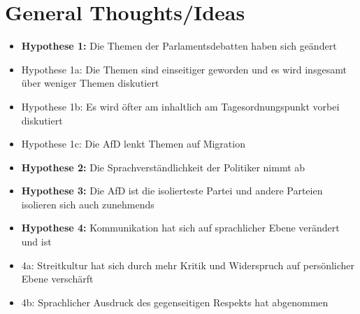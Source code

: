 \section{General Thoughts/Ideas}

\begin{itemize} 
\item [] {\bfseries Hypothese 1:} 
Die Themen der Parlamentsdebatten haben sich geändert
\item  Hypothese 1a: Die Themen sind einseitiger geworden und es wird insgesamt über weniger Themen diskutiert
\item  Hypothese 1b: Es wird öfter am inhaltlich am Tagesordnungspunkt vorbei diskutiert 
\item Hypothese 1c: Die AfD lenkt Themen auf Migration  
\item [] {\bfseries Hypothese 2:} 
Die Sprachverständlichkeit der Politiker nimmt ab
\item [] {\bfseries Hypothese 3:} 
Die AfD ist die isolierteste Partei und andere Parteien isolieren sich auch zunehmends 
\item [] {\bfseries Hypothese 4:} 
Kommunikation hat sich auf sprachlicher Ebene verändert und ist
\item[] 4a: Streitkultur hat sich durch mehr Kritik und Widerspruch auf persönlicher Ebene verschärft
\item[] 4b: Sprachlicher Ausdruck des gegenseitigen Respekts hat abgenommen 

\end{itemize}






\newpage